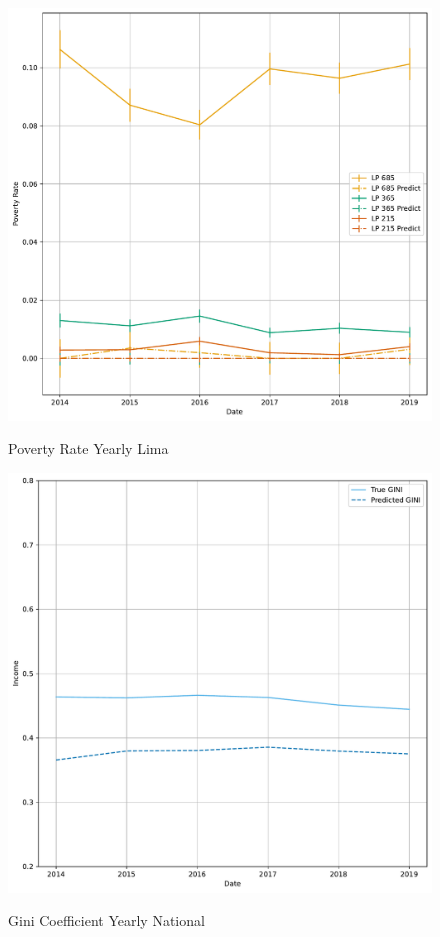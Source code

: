 \begin{figure}[H]
    \centering
    \caption{Poverty Rate Yearly Lima}
    \includegraphics[width=\textwidth]{../figures/fig8c_poverty_rate_time_series_lima.pdf}
    \label{fig:enter-label}
\end{figure}


\begin{figure}[H]
    \centering
    \caption{Gini Coefficient Yearly National}
    \includegraphics[width=\textwidth]{../figures/fig9_gini_time_series.pdf}
    \label{fig:enter-label}
\end{figure}

